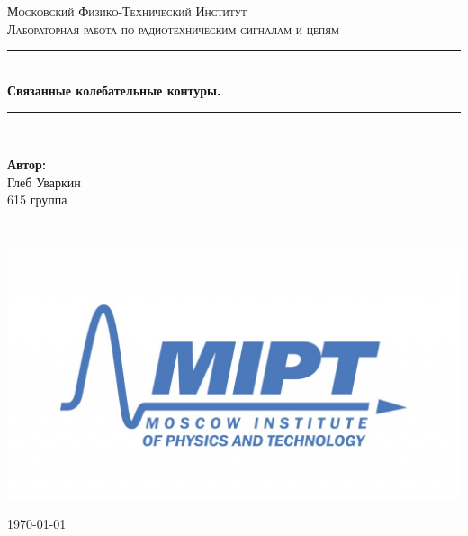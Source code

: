 \documentclass[a4paper, 12pt, twoside]{article}
\newenvironment{bottompar}{\par\vspace*{\fill}}{\clearpage}
\begin{document}
\begin{titlepage}

\newcommand{\HRule}{\rule{\linewidth}{0.7mm}} %

\center %
 

\textsc{\LARGE Московский Физико-Технический Институт}\\[1,5cm] %

\textsc{\large Лабораторная работа по радиотехническим сигналам и цепям}\\[0.5cm] %


\HRule
\\[0.4cm]
{ \huge \bfseries Связанные колебательные контуры.}
\\[0.4cm] %
\HRule
\\[1.5cm]


 


	\begin{center} \large
		\textbf{Автор:}\\
		Глеб Уваркин \\
		615 группа
	\end{center}

~


\begin{bottompar}
	\begin{center}
		\includegraphics[width = 80 mm]{logo.jpg}
	\end{center}
	{\large \today}

\end{bottompar}
\vfill %

\end{titlepage}
\end{document}
